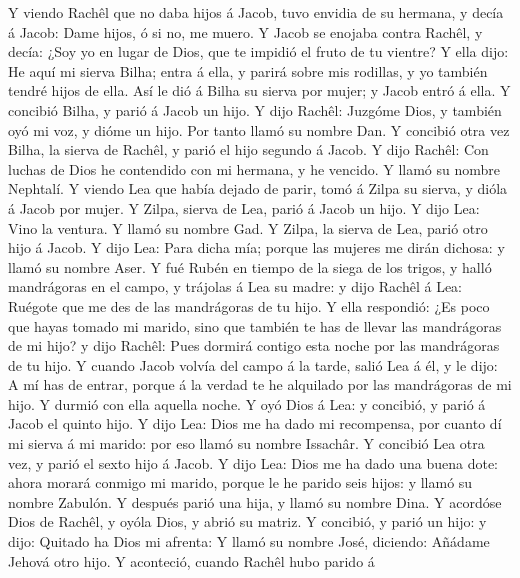  Y viendo Rachêl que no daba hijos á Jacob, tuvo envidia de
su hermana, y decía á Jacob: Dame hijos, ó si no, me muero. 
Y Jacob se enojaba contra Rachêl, y decía: ¿Soy yo en lugar de Dios, que
te impidió el fruto de tu vientre?  Y ella dijo: He aquí mi
sierva Bilha; entra á ella, y parirá sobre mis rodillas, y yo también
tendré hijos de ella.  Así le dió á Bilha su sierva por
mujer; y Jacob entró á ella.  Y concibió Bilha, y parió á
Jacob un hijo.  Y dijo Rachêl: Juzgóme Dios, y también oyó
mi voz, y dióme un hijo. Por tanto llamó su nombre Dan.  Y
concibió otra vez Bilha, la sierva de Rachêl, y parió el hijo segundo á
Jacob.  Y dijo Rachêl: Con luchas de Dios he contendido con
mi hermana, y he vencido. Y llamó su nombre Nephtalí.  Y
viendo Lea que había dejado de parir, tomó á Zilpa su sierva, y dióla á
Jacob por mujer.  Y Zilpa, sierva de Lea, parió á Jacob un
hijo.  Y dijo Lea: Vino la ventura. Y llamó su nombre Gad.
 Y Zilpa, la sierva de Lea, parió otro hijo á Jacob.
 Y dijo Lea: Para dicha mía; porque las mujeres me dirán
dichosa: y llamó su nombre Aser.  Y fué Rubén en tiempo de
la siega de los trigos, y halló mandrágoras en el campo, y trájolas á
Lea su madre: y dijo Rachêl á Lea: Ruégote que me des de las mandrágoras
de tu hijo.  Y ella respondió: ¿Es poco que hayas tomado mi
marido, sino que también te has de llevar las mandrágoras de mi hijo? y
dijo Rachêl: Pues dormirá contigo esta noche por las mandrágoras de tu
hijo.  Y cuando Jacob volvía del campo á la tarde, salió
Lea á él, y le dijo: A mí has de entrar, porque á la verdad te he
alquilado por las mandrágoras de mi hijo. Y durmió con ella aquella
noche.  Y oyó Dios á Lea: y concibió, y parió á Jacob el
quinto hijo.  Y dijo Lea: Dios me ha dado mi recompensa,
por cuanto dí mi sierva á mi marido: por eso llamó su nombre Issachâr.
 Y concibió Lea otra vez, y parió el sexto hijo á Jacob.
 Y dijo Lea: Dios me ha dado una buena dote: ahora morará
conmigo mi marido, porque le he parido seis hijos: y llamó su nombre
Zabulón.  Y después parió una hija, y llamó su nombre Dina.
 Y acordóse Dios de Rachêl, y oyóla Dios, y abrió su
matriz.  Y concibió, y parió un hijo: y dijo: Quitado ha
Dios mi afrenta:  Y llamó su nombre José, diciendo: Añádame
Jehová otro hijo.  Y aconteció, cuando Rachêl hubo parido á
